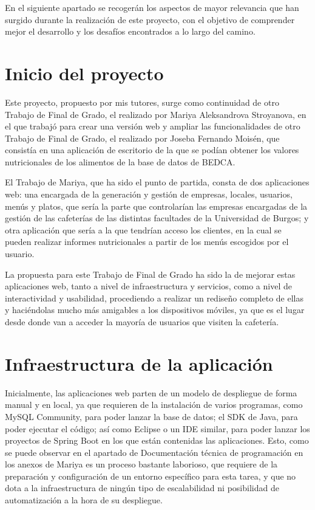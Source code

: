 
En el siguiente apartado se recogerán los aspectos de mayor relevancia que han surgido durante la realización de este proyecto, con el objetivo de comprender mejor el desarrollo y los desafíos encontrados a lo largo del camino.

\section{Inicio del proyecto}

Este proyecto, propuesto por mis tutores, surge como continuidad de otro Trabajo de Final de Grado, el realizado por Mariya Aleksandrova Stroyanova, en el que trabajó para crear una versión web y ampliar las funcionalidades de otro Trabajo de Final de Grado, el realizado por Joseba Fernando Moisén, que consistía en una aplicación de escritorio de la que se podían obtener los valores nutricionales de los alimentos de la base de datos de BEDCA. 

El Trabajo de Mariya, que ha sido el punto de partida, consta de dos aplicaciones web: una encargada de la generación y gestión de empresas, locales, usuarios, menús y platos, que sería la parte que controlarían las empresas encargadas de la gestión de las cafeterías de las distintas facultades de la Universidad de Burgos; y otra aplicación que sería a la que tendrían acceso los clientes, en la cual se pueden realizar informes nutricionales a partir de los menús escogidos por el usuario.

La propuesta para este Trabajo de Final de Grado ha sido la de mejorar estas aplicaciones web, tanto a nivel de infraestructura y servicios, como a nivel de interactividad y usabilidad, procediendo a realizar un rediseño completo de ellas y haciéndolas mucho más amigables a los dispositivos móviles, ya que es el lugar desde donde van a acceder la mayoría de usuarios que visiten la cafetería.

\section{Infraestructura de la aplicación}

Inicialmente, las aplicaciones web parten de un modelo de despliegue de forma manual y en local, ya que requieren de la instalación de varios programas, como MySQL Community, para poder lanzar la base de datos; el SDK de Java, para poder ejecutar el código; así como Eclipse o un IDE similar, para poder lanzar los proyectos de Spring Boot en los que están contenidas las aplicaciones. Esto, como se puede observar en el apartado de Documentación técnica de programación en los anexos de Mariya \cite{tfg-mariya:anexos} es un proceso bastante laborioso, que requiere de la preparación y configuración de un entorno específico para esta tarea, y que no dota a la infraestructura de ningún tipo de escalabilidad ni posibilidad de automatización a la hora de su despliegue.

